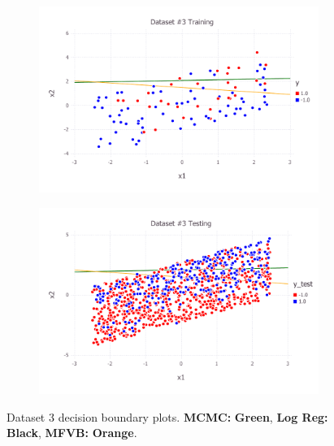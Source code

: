 \begin{figure}[h!]
\centering
    \begin{subfigure}[b]{0.45\textwidth}
	\includegraphics[scale=0.6]{figures/train_final_3.pdf}
    \end{subfigure}
    \quad
    \begin{subfigure}[b]{0.45\textwidth}
	\includegraphics[scale=0.6]{figures/test_final_3.pdf}
	\end{subfigure}
 \caption{Dataset 3 decision boundary plots. {\bf MCMC:}  {\bf \color{ao(english)} Green}, {\bf Log Reg:} {\bf \color{black} Black}, {\bf MFVB:}  {\bf \color{burntorange} Orange}.}  \label{fig:dataset_3}  
\end{figure}
